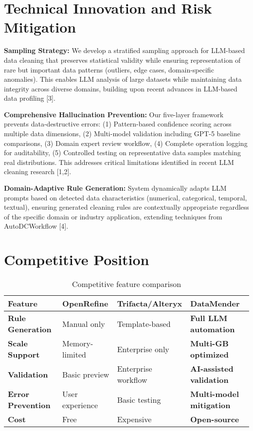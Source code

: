 \documentclass[11pt]{article}
\begin{document}
\section{\color{primaryblue}Technical Innovation and Risk Mitigation}

\textbf{Sampling Strategy:} We develop a stratified sampling approach for LLM-based data cleaning that preserves statistical validity while ensuring representation of rare but important data patterns (outliers, edge cases, domain-specific anomalies). This enables LLM analysis of large datasets while maintaining data integrity across diverse domains, building upon recent advances in LLM-based data profiling [3].

\textbf{Comprehensive Hallucination Prevention:} Our five-layer framework prevents data-destructive errors: (1) Pattern-based confidence scoring across multiple data dimensions, (2) Multi-model validation including GPT-5 baseline comparisons, (3) Domain expert review workflow, (4) Complete operation logging for auditability, (5) Controlled testing on representative data samples matching real distributions. This addresses critical limitations identified in recent LLM cleaning research [1,2].

\textbf{Domain-Adaptive Rule Generation:} System dynamically adapts LLM prompts based on detected data characteristics (numerical, categorical, temporal, textual), ensuring generated cleaning rules are contextually appropriate regardless of the specific domain or industry application, extending techniques from AutoDCWorkflow [4].

\section{\color{primaryblue}Competitive Position}

\begin{table}[h]
\centering
\footnotesize
\begin{tabular}{|l|p{2.2cm}|p{2.2cm}|p{2.8cm}|}
\hline
\textbf{Feature} & \textbf{OpenRefine} & \textbf{Trifacta/Alteryx} & \textbf{DataMender} \\
\hline
\textbf{Rule Generation} & Manual only & Template-based & \textbf{Full LLM automation} \\
\hline
\textbf{Scale Support} & Memory-limited & Enterprise only & \textbf{Multi-GB optimized} \\
\hline
\textbf{Validation} & Basic preview & Enterprise workflow & \textbf{AI-assisted validation} \\
\hline
\textbf{Error Prevention} & User experience & Basic testing & \textbf{Multi-model mitigation} \\
\hline
\textbf{Cost} & Free & Expensive & \textbf{Open-source} \\
\hline
\end{tabular}
\caption{Competitive feature comparison}
\label{tab:comparison}
\end{table}
\end{document}
